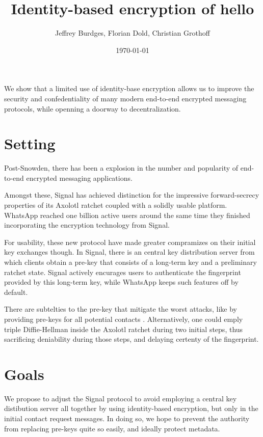 \documentclass[twoside,letterpaper]{sig-alternate}
\title{Identity-based encryption of hello} %
\author{Jeffrey Burdges, Florian Dold, Christian Grothoff}
\date{\today}
\begin{document}
\maketitle


We show that a limited use of identity-base encryption allows us to
improve the security and confedentiality of many modern end-to-end
encrypted messaging protocols,
 while openning a doorway to decentralization. 

\section{Setting}

Post-Snowden, there has been a explosion in the number and popularity
of end-to-end encrypted messaging applications.\cite{}

Amongst these, Signal has achieved distinction for the impressive
forward-secrecy properties of its Axolotl ratchet\cite{TextSecure}
 coupled with a solidly usable platform.
WhatsApp reached one billion active users around the same time
they finished incorporating the encryption technology from Signal.
\cite{}

For usability, these new protocol have made greater compramizes on
their initial key exchanges though.  In Signal, there is an central
key distribution server from which clients obtain a pre-key that
consists of a long-term key and a preliminary ratchet state.
%
Signal actively encurages users to authenticate the fingerprint
provided  by this long-term key, while WhatsApp keeps such features
off by default.

There are subtelties to the pre-key that mitigate the worst attacks,
like by providing pre-keys for all potential contacts
 \cite[\S4.3]{TextSecure}.
Alternatively, one could emply triple Diffie-Hellman inside the
Axolotl ratchet during two initial steps,
 thus sacrificing deniability during those steps,
 and delaying certenty of the fingerprint. 

\section{Goals} 

We propose to adjust the Signal protocol to avoid employing a central
key distibution server all together by using identity-based encryption,
but only in the initial contact request messages.
In doing so, we hope to prevent the authority from replacing pre-keys
quite so easily, and ideally protect metadata.
\end{document}
